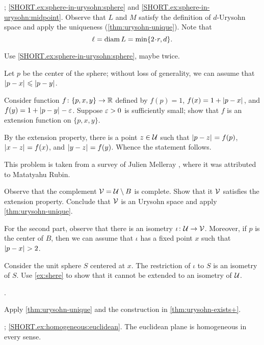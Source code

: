 


\parbf{\ref{ex:sphere-in-urysohn}}; \ref{SHORT.ex:sphere-in-urysohn:sphere} and \ref{SHORT.ex:sphere-in-urysohn:midpoint}.
Observe that $L$ and $M$ satisfy the definition of $d$-Urysohn space and apply the uniqueness (\ref{thm:urysohn-unique}).
Note that
\[\ell=\diam L=\min\{2\cdot r, d\}.\]

Use \ref{SHORT.ex:sphere-in-urysohn:sphere}, maybe twice.

Let $p$ be the center of the sphere;
without loss of generality, we can assume that $\dist{p}{x}{}\le \dist{p}{y}{}$.

Consider function $f\colon\{p,x,y\}\to\mathbb{R}$ defined by $f(p)=1$, $f(x)=1+\dist{p}{x}{}$, and $f(y)=1+\dist{p}{y}{}-\eps$.
Suppose $\varepsilon>0$ is sufficiently small;
show that $f$ is an extension function on $\{p,x,y\}$.

By the extension property, there is a point $z\in \mathcal{U}$ such that $\dist{p}{z}{}=f(p)$, $\dist{x}{z}{}=f(x)$, and $\dist{y}{z}{}=f(y)$.
Whence the statement follows.

 This problem is taken from a survey of Julien Melleray
 \cite[Prop. 4.3]{melleray}, where it was attributed to Matatyahu Rubin.


Observe that the complement $\mathcal{V}=\mathcal{U}\setminus B$ is complete.
Show that it $\mathcal{V}$ satisfies the extension property.
Conclude that $\mathcal{V}$ is an Urysohn space and apply \ref{thm:urysohn-unique}.

For the second part, observe that there is an isometry $\iota\colon\mathcal{U}\to \mathcal{V}$.
Moreover, if $p$ is the center of $B$, then we can assume that $\iota$ has a fixed point $x$ such that $\dist{p}{x}{}>2$.

Consider the unit sphere $S$ centered at $x$.
The restriction of $\iota$ to $S$ is an isometry of $S$.
Use \ref{ex:shere} to show that it cannot be extended to an isometry of $\mathcal{U}$.

 \cite[Sec. 4.4]{melleray}.

Apply \ref{thm:urysohn-unique} and the construction in \ref{thm:urysohn-exists+}.

\parbf{\ref{ex:homogeneous}}; \ref{SHORT.ex:homogeneous:euclidean}.
The euclidean plane is homogeneous in every sense.

